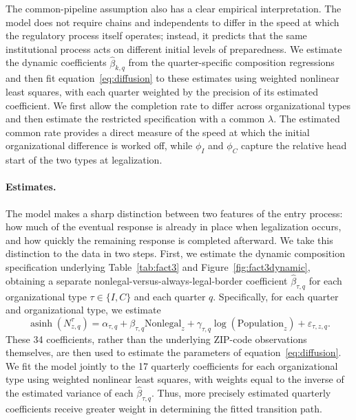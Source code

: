 \documentclass[english,12pt]{article}
\begin{document}
The common-pipeline assumption also has a clear empirical interpretation. The model does not require chains and independents to differ in the speed at which the regulatory process itself operates; instead, it predicts that the same institutional process acts on different initial levels of preparedness. We estimate the dynamic coefficients $\hat{\beta}_{k,q}$ from the quarter-specific composition regressions and then fit equation~\eqref{eq:diffusion} to these estimates using weighted nonlinear least squares, with each quarter weighted by the precision of its estimated coefficient. We first allow the completion rate to differ across organizational types and then estimate the restricted specification with a common $\lambda$. The estimated common rate provides a direct measure of the speed at which the initial organizational difference is worked off, while $\phi_I$ and $\phi_C$ capture the relative head start of the two types at legalization.

\paragraph{Estimates.}

The model makes a sharp distinction between two features of the entry process: how much of the eventual response is already in place when legalization occurs, and how quickly the remaining response is completed afterward. We take this distinction to the data in two steps. First, we estimate the dynamic composition specification underlying Table~\ref{tab:fact3} and Figure~\ref{fig:fact3dynamic}, obtaining a separate nonlegal-versus-always-legal-border coefficient $\hat{\beta}_{\tau,q}$ for each organizational type $\tau\in\{I,C\}$ and each quarter $q$. Specifically, for each quarter and organizational type, we estimate
\begin{equation}
\label{eq:firststage_diffusion}
\operatorname{asinh}(N^\tau_{z,q})
=
\alpha_{\tau,q}
+
\beta_{\tau,q}\text{Nonlegal}_z
+
\gamma_{\tau,q}\log(\text{Population}_z)
+
\varepsilon_{\tau,z,q}.
\end{equation}
These 34 coefficients, rather than the underlying ZIP-code observations themselves, are then used to estimate the parameters of equation~\eqref{eq:diffusion}. We fit the model jointly to the 17 quarterly coefficients for each organizational type using weighted nonlinear least squares, with weights equal to the inverse of the estimated variance of each $\hat{\beta}_{\tau,q}$. Thus, more precisely estimated quarterly coefficients receive greater weight in determining the fitted transition path.
\end{document}
